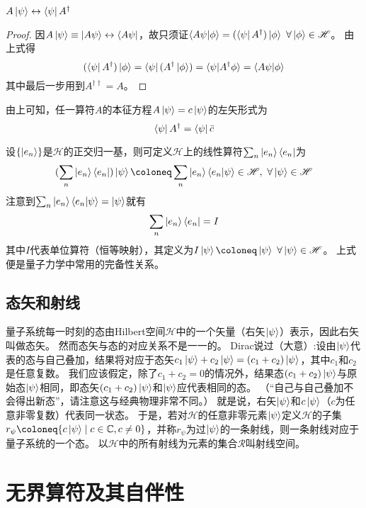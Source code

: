 \begin{theorem}
    $A\ket{\psi} \leftrightarrow \bra{\psi}A^\dagger$
\end{theorem}

\begin{proof}
    因$A\ket{\psi} \equiv \ket{A\psi} \leftrightarrow \bra{A\psi}$，故只须证$\braket{A\psi | \phi} = (\bra{\psi}A^\dagger)\ket{\phi} ~ \forall \ket{\phi} \in \mathscr{H}$。
    由上式得
    $$(\bra{\psi}A^\dagger)\ket{\phi} = \bra{\psi}(A^\dagger\ket{\phi}) = \braket{\psi | A^\dagger\phi} = \braket{A\psi | \phi}$$
    其中最后一步用到$A^{\dagger\dagger} = A$。
\end{proof}

由上可知，任一算符$A$的本征方程$A\ket{\psi} = c\ket{\psi}$的左矢形式为
$$\bra{\psi}A^\dagger = \bra{\psi}\bar{c}$$

设$\{\ket{e_n}\}$是$\mathscr{H}$的正交归一基，则可定义$\mathscr{H}$上的线性算符$\sum_n\ket{e_n}\bra{e_n}$为
$$(\sum_n\ket{e_n}\bra{e_n})\ket{\psi} \coloneq \sum_n\ket{e_n}\braket{e_n | \psi} \in \mathscr{H}, ~ \forall \ket{\psi} \in \mathscr{H}$$
注意到$\sum_n\ket{e_n}\braket{e_n | \psi} = \ket{\psi}$就有
$$\sum_n\ket{e_n}\bra{e_n} = I$$
其中$I$代表单位算符（恒等映射），其定义为$I\ket{\psi} \coloneq \ket{\psi} ~ \forall \ket{\psi} \in \mathscr{H}$。
上式便是量子力学中常用的完备性关系。

\subsection{态矢和射线}

量子系统每一时刻的态由Hilbert空间$\mathscr{H}$中的一个矢量（右矢$\ket{\psi}$）表示，因此右矢叫做态矢。
然而态矢与态的对应关系不是一一的。
Dirac说过（大意）:设由$\ket{\psi}$代表的态与自己叠加，结果将对应于态矢$c_1\ket{\psi} + c_2\ket{\psi} = (c_1 + c_2)\ket{\psi}$，其中$c_1$和$c_2$是任意复数。
我们应该假定，除了$c_1 + c_2 = 0$的情况外，结果态$(c_1 + c_2)\ket{\psi}$与原始态$\ket{\psi}$相同，即态矢$(c_1 + c_2)\ket{\psi}$和$\ket{\psi}$应代表相同的态。
（``自己与自己叠加不会得出新态''，请注意这与经典物理非常不同。）
就是说，右矢$\ket{\psi}$和$c\ket{\psi}$（$c$为任意非零复数）代表同一状态。
于是，若对$\mathscr{H}$的任意非零元素$\ket{\psi}$定义$\mathscr{H}$的子集$r_\psi \coloneq \{c\ket{\psi} \mid c \in \mathbb{C}, c \neq 0\}$，并称$r_\psi$为过$\ket{\psi}$的一条射线，则一条射线对应于量子系统的一个态。
以$\mathscr{H}$中的所有射线为元素的集合$\mathscr{R}$叫射线空间。

\section{无界算符及其自伴性}

